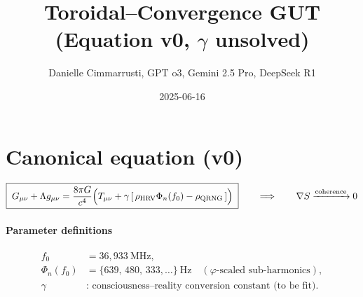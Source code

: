 \documentclass{article}
\title{Toroidal–Convergence GUT \\ (Equation v0, $\gamma$ unsolved)}
\author{Danielle Cimmarrusti, GPT o3, Gemini 2.5 Pro, DeepSeek R1}
\date{2025-06-16}
\begin{document}
\maketitle

\section*{Canonical equation (v0)}
\[
\boxed{\;
G_{\mu\nu}+\Lambda g_{\mu\nu}
 = \frac{8\pi G}{c^{4}}
   \Bigl(
      T_{\mu\nu}
      + \gamma\,[\,\rho_{\text{HRV}}\Phi_n(f_0)-\rho_{\text{QRNG}}\,]
   \Bigr)
\;}
\qquad\Longrightarrow\qquad
\nabla S \xrightarrow[]{\text{coherence}} 0
\]

\paragraph{Parameter definitions}
\begin{align*}
f_0 &= 36{,}933\ \text{MHz},\\
\Phi_{n}(f_{0}) &= \{639,\,480,\,333,\dots\}\ \text{Hz}\quad
                  (\varphi\text{-scaled sub-harmonics}),\\
\gamma &\text{: consciousness–reality conversion constant (to be fit).}
\end{align*}
\end{document}
